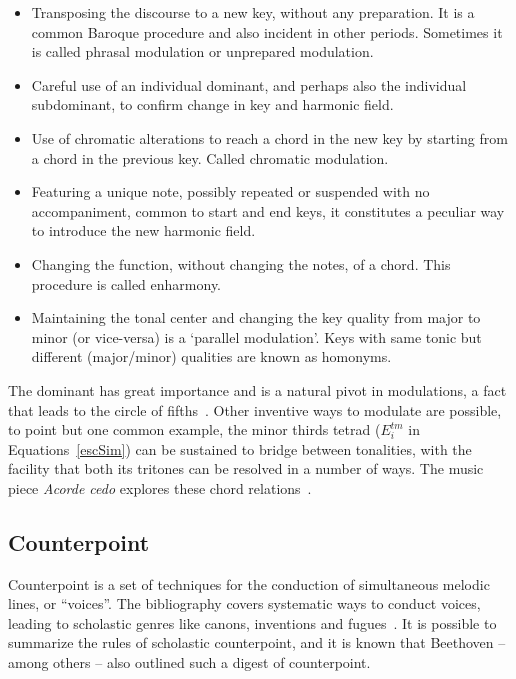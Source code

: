 \begin{itemize}
    \item Transposing the discourse to a new key, without any preparation. It is a common Baroque procedure and also incident in other periods. Sometimes it is 
    called phrasal modulation or unprepared modulation.
    \item Careful use of an individual dominant, and perhaps also the individual
    subdominant, to confirm change in key and harmonic field.
    \item Use of chromatic alterations to reach a chord in the new key by starting from a chord in the previous key. Called chromatic modulation.
    \item Featuring a unique note, possibly repeated or suspended with no accompaniment, common to start and end keys, it constitutes a peculiar way
    to introduce the new harmonic field.
    \item Changing the function, without changing the notes, of a chord.
        This procedure is called enharmony.
    \item Maintaining the tonal center and changing the key quality from major to minor
    (or vice-versa) is a `parallel modulation'. Keys with same tonic but
		different (major/minor) qualities are known as homonyms.
\end{itemize}

The dominant has great importance and is a natural pivot in modulations,
a fact that leads to the circle of fifths~\cite{Harmonia,Salzer,Koellheuteur,Harmony}.
Other inventive ways to modulate are possible, to point but one common example, the minor thirds tetrad ($E_i^{tm}$ in Equations~\ref{escSim}) can be sustained to bridge between tonalities, with the facility that both its tritones can be resolved in a number of ways.
The music piece \emph{Acorde cedo} explores these chord relations~\cite{MASSA}.

\subsection{Counterpoint}\label{subsec:contraponto}
Counterpoint is a set of techniques for the conduction of simultaneous melodic lines, or ``voices''.
The bibliography covers systematic ways to conduct voices, leading to scholastic genres like canons, inventions and fugues~\cite{Fux,SchoenbergContra}. It is possible to
summarize the rules of scholastic counterpoint, and it is known that Beethoven --
among others -- also outlined such a digest of counterpoint.

